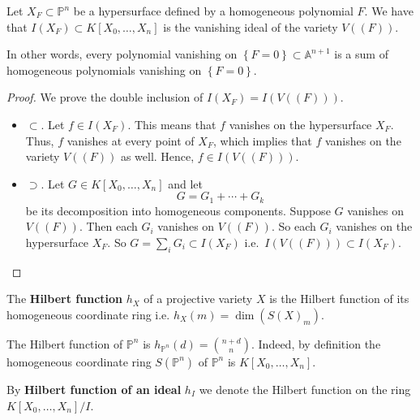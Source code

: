 \documentclass[12pt, a4paper]{article}
\renewcommand{\AA}{\mathbb A}
\newcommand{\PP}{\mathbb P}
\begin{document}
\begin{proposition}
    Let \(X_F \subset \PP^n\) be a hypersurface defined by a homogeneous polynomial \(F\). We have that \(I(X_F) \subset K[X_0,\ldots,X_n]\) is the vanishing ideal of the variety \(V((F))\).
\end{proposition}

\begin{mdnote}
    In other words, every polynomial vanishing on \(\left\{ F=0 \right\} \subset \AA^{n+1}\) is a sum of homogeneous polynomials vanishing on \(\left\{ F=0 \right\}\). 
\end{mdnote}

\begin{proof}
    We prove the double inclusion of \(I(X_F) = I(V((F)))\).
    \begin{itemize}
        \item \(\subset\). Let \(f \in I(X_F)\). This means that \(f\) vanishes on the hypersurface \(X_F\). Thus, \(f\) vanishes at every point of \(X_F\), which implies that \(f\) vanishes on the variety \(V((F))\) as well. Hence, \(f \in I(V((F)))\).
        \item \(\supset\). Let \(G \in K[X_0,\ldots,X_n]\) and let 
        \[G = G_1 +\cdots +G_k\] be its decomposition into homogeneous components. Suppose \(G\) vanishes on \(V((F))\). Then each \(G_i\) vanishes on \(V((F))\). So each \(G_i\) vanishes on the hypersurface \(X_F\). So \(G = \sum_i G_i \subset I(X_F)\) i.e.\ \(I(V((F))) \subset I(X_F)\). 
    \end{itemize}
\end{proof}

\begin{definition}
    The \textbf{Hilbert function} \(h_X\) of a projective variety \(X\) is the Hilbert function of its homogeneous coordinate ring i.e. \(h_X(m)=\dim(S(X)_m)\).
\end{definition}

\begin{mdexample}
    The Hilbert function of \(\PP^n\) is \(h_{\PP^n}(d) = \binom{n+d}{n}\). Indeed, by definition the homogeneous coordinate ring \(S(\PP^n)\) of \(\PP^n\) is \(K[X_0,\ldots,X_n]\).
\end{mdexample}

\begin{definition}
    By \textbf{Hilbert function of an ideal} \(h_I\) we denote the Hilbert function on the ring \(K[X_0,\ldots,X_n]/I\).
\end{definition}
\end{document}
